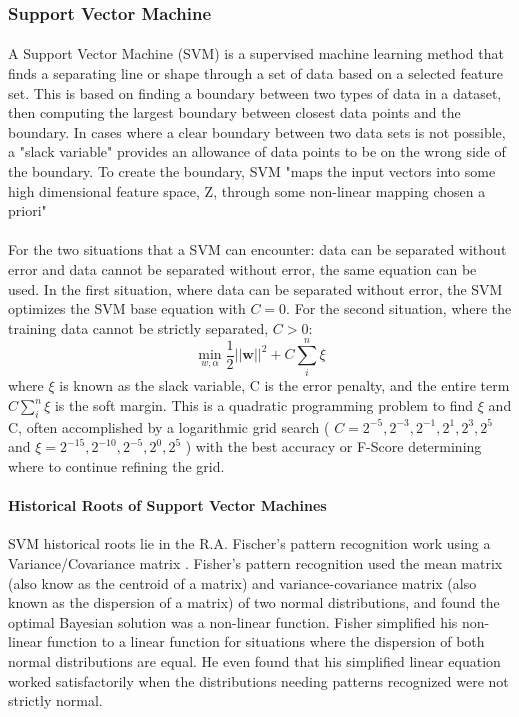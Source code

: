 		\subsubsection{Support Vector Machine}
			\paragraph{}A Support Vector Machine (SVM) is a supervised machine learning method that finds a separating line or shape through a set of data based on a selected feature set.  This is based on finding a boundary between two types of data in a dataset, then computing the largest boundary between closest data points and the boundary.  In cases where a clear boundary between two data sets is not possible, a "slack variable" provides an allowance of data points to be on the wrong side of the boundary. To create the boundary, SVM "maps the input vectors into some high dimensional feature space, Z, through some non-linear mapping chosen a priori" \cite{vapnik_support-vector_1995}

			\paragraph{}For the two situations that a SVM can encounter: data can be separated without error and data cannot be separated without error, the same equation can be used.  In the first situation, where data can be separated without error, the SVM optimizes the SVM base equation with $C=0$.  For the second situation, where the training data cannot be strictly separated, $C > 0$:
			\begin{equation} \min_{w,\alpha}\frac{1}{2}\mathbf{||w||}^2 + C \sum_i^n{\xi} 
			\end{equation}
			where $\xi$ is known as the slack variable, C is the error penalty, and the entire term $C\sum_i^n{\xi}$ is the soft margin.  This is a quadratic programming problem to find $\xi$ and C, often accomplished by a logarithmic grid search ( $C = { 2^{-5}, 2^{-3}, 2^{-1}, 2^1, 2^3, 2^5}$ and $\xi = {2^{-15}, 2^{-10}, 2^{-5}, 2^ 0, 2^5}$ ) with the best accuracy or F-Score determining where to continue refining the grid.

			\paragraph{Historical Roots of Support Vector Machines}
			SVM historical roots lie in the R.A. Fischer's pattern recognition work using a Variance/Covariance matrix \cite{fisher_use_1936}.  Fisher's pattern recognition used the mean matrix (also know as the centroid of a matrix) and  variance-covariance matrix (also known as the dispersion of a matrix) of two normal distributions, and found the optimal Bayesian solution was a non-linear function.  Fisher simplified his non-linear function to a linear function for situations where the dispersion of both normal distributions are equal.  He even found that his simplified linear equation worked satisfactorily when the distributions needing patterns recognized were not strictly normal.


